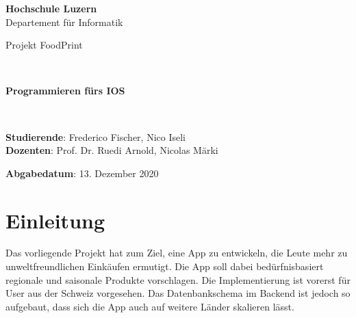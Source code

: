 \documentclass[12pt,titlepage]{article}
\begin{document}
\thispagestyle{empty}

\begin{center}
\textbf{Hochschule Luzern}\\
Departement für Informatik\\[12\baselineskip]

\begin{Huge}
Projekt FoodPrint
\end{Huge} \\[6\baselineskip]

\begin{large}
\textbf{Programmieren fürs IOS}
\end{large} \\[6\baselineskip]

\begin{large}
\textbf{Studierende}: Frederico Fischer, Nico Iseli\\
\textbf{Dozenten}: Prof. Dr. Ruedi Arnold, Nicolas Märki\

\textbf{Abgabedatum}: 13. Dezember 2020 \\ 
\end{large}
\end{center}
\newpage


\section{Einleitung}
Das vorliegende Projekt hat zum Ziel, eine App zu entwickeln, die Leute mehr zu unweltfreundlichen Einkäufen ermutigt. Die App soll dabei bedürfnisbasiert regionale und saisonale Produkte vorschlagen. Die Implementierung ist vorerst für User aus der Schweiz vorgesehen. Das Datenbankschema im Backend ist jedoch so aufgebaut, dass sich die App auch auf weitere Länder skalieren lässt.
\end{document}
